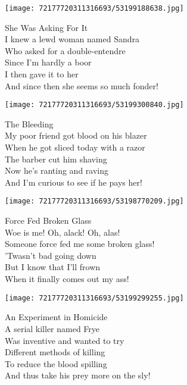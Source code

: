 \documentclass[10pt,letterpaper]{article}
\begin{document}
\begin{center}\texttt{[image: 72177720311316693/53199188638.jpg]}
\end{center}
\begin{center}
She Was Asking For It\\
\vskip 0.2in
I knew a lewd woman named Sandra\\
Who asked for a double-entendre\\
Since I'm hardly a boor\\
I then gave it to her\\
And since then she seems so much fonder!\\
\end{center}
\pagebreak

\begin{center}
\texttt{[image: 72177720311316693/53199300840.jpg]}
\end{center}

\begin{center}
The Bleeding\\
\vskip 0.2in
My poor friend got blood on his blazer\\
When he got sliced today with a razor\\
The barber cut him shaving\\
Now he's ranting and raving\\
And I'm curious to see if he pays her!\\
\end{center}
\pagebreak

\begin{center}\texttt{[image: 72177720311316693/53198770209.jpg]}
\end{center}
\begin{center}
Force Fed Broken Glass\\
\vskip 0.2in
Woe is me!  Oh, alack!  Oh, alas!\\
Someone force fed me some broken glass!\\
'Twasn't bad going down\\
But I know that I'll frown\\
When it finally comes out my ass!\\
\end{center}
\pagebreak

\begin{center}\texttt{[image: 72177720311316693/53199299255.jpg]}
\end{center}
\begin{center}
An Experiment in Homicide\\
\vskip 0.2in
A serial killer named Frye\\
Was inventive and wanted to try\\
Different methods of killing\\
To reduce the blood spilling\\
And thus take his prey more on the sly!\\
\end{center}
\pagebreak
\end{document}
